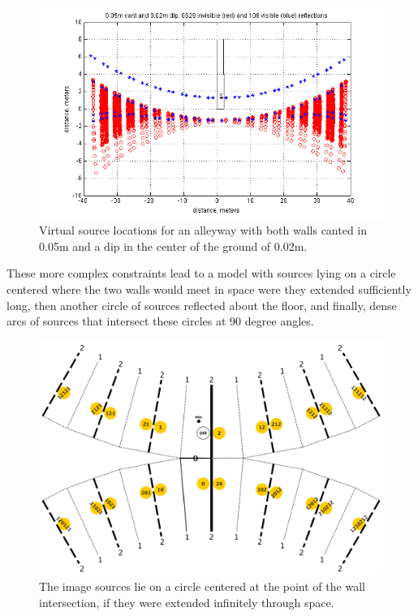 \documentclass{aes137}
\begin{document}
\begin{figure}[h!] \centering \includegraphics[width=\linewidth, trim=13mm 2mm 10mm 3mm, clip]{images/ISM_0pt05m_cant_0pt02m_dip.png} \caption{Virtual source locations for an alleyway with both walls canted in 0.05m and a dip in the center of the ground of 0.02m.} \end{figure}

These more complex constraints lead to a model with sources lying on a circle centered where the two walls would meet in space were they extended sufficiently long, then another circle of sources reflected about the floor, and finally, dense arcs of sources that intersect these circles at 90 degree angles.

\begin{figure}[h!] \centering \includegraphics[width=\linewidth]{images/ISM_canted_v2.pdf} \caption{The image sources lie on a circle centered at the point of the wall intersection, if they were extended infinitely through space.} \end{figure}
\end{document}
